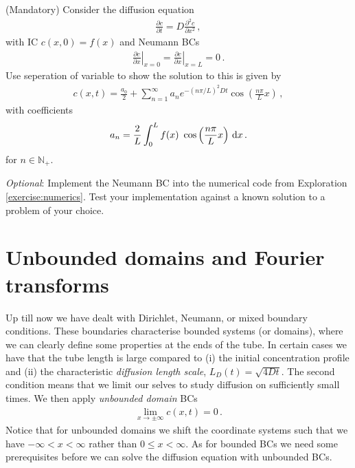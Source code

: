 \begin{exerciseregion}
	\begin{exploration} \label{expl:diffneumann}
		(Mandatory) Consider the diffusion equation
		\begin{eqnarray}
			\frac{\partial c}{\partial t} = D\frac{\partial^2c}{\partial x^2} \, , 
		\end{eqnarray}
		with IC $c(x,0)=f(x)$ and Neumann BCs
		\begin{eqnarray}
			\left.\frac{\partial c}{\partial x}\right|_{x=0}=\left.\frac{\partial c}{\partial x}\right|_{x=L}=0 \, .
		\end{eqnarray}
		Use seperation of variable to show the solution to this is	given by
		\begin{eqnarray}
			c(x,t)=\frac{a_0}{2} + \sum_{n=1}^\infty a_n e^{-(n\pi/L)^2Dt}  
			\cos\left(\frac{n\pi}{L} x\right) \, ,
		\end{eqnarray}
		with coefficients
		\begin{eqnarray}
			a_n = \frac{2}{L}\int_0^Lf(x)\	\cos\left(\frac{n\pi}{L} x\right) \, \d x \, .
		\end{eqnarray}
		for $n \in \mathbb{N}_+$.

		\textit{Optional}: Implement the Neumann BC into the numerical code 
		from Exploration \ref{exercise:numerics}. 
		Test your implementation against a known solution to a problem of your choice.
	\end{exploration}

\end{exerciseregion}

\section{Unbounded domains and Fourier transforms}
Up till now we have dealt with Dirichlet, Neumann, or mixed boundary conditions. 
These boundaries characterise bounded systems (or domains), where we can clearly define some properties at the ends of the tube. 
In certain cases we have that the tube length is large compared to (i) the initial concentration profile and 
(ii) the characteristic \emph{diffusion length scale}, $L_D(t) = \sqrt{4 D t}$. 
The second condition means that we limit our selves to study diffusion on sufficiently small times. 
We then apply \emph{unbounded domain} BCs    
\begin{eqnarray}
	\lim_{x \rightarrow \pm \infty} c(x,t) = 0  \, .
\end{eqnarray}
Notice that for unbounded domains we shift the coordinate systems such that we have $-\infty < x < \infty$ 
rather than $0 \leq x < \infty$. As for bounded BCs we need some prerequisites 
before we can solve the diffusion equation with unbounded BCs. 

